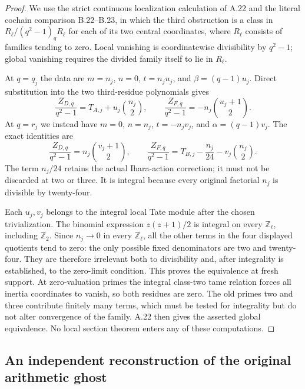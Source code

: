 \begin{proof}
We use the strict continuous localization calculation of A.22 and
the literal cochain comparison B.22--B.23, in
which the third obstruction is a class in
$R_\ell/(q^2-1)_qR_\ell$ for each of its two central coordinates,
where $R_\ell$ consists of families tending to zero. Local vanishing
is coordinatewise divisibility by $q^2-1$; global vanishing requires
the divided family itself to lie in $R_\ell$.

At $q=q_j$ the data are
$m=n_j$, $n=0$, $t=n_ju_j$, and $\beta=(q-1)u_j$.
Direct substitution into the two third-residue polynomials gives
\[
\frac{Z_{D,q}}{q^2-1}
 =T_{A,j}+u_j\binom{n_j}{2},\qquad
\frac{Z_{F,q}}{q^2-1}
 =-n_j\binom{u_j+1}{2}.
\]
At $q=r_j$ we instead have $m=0$, $n=n_j$, $t=-n_jv_j$,
and $\alpha=(q-1)v_j$. The exact identities are
\[
\frac{Z_{D,q}}{q^2-1}
 =n_j\binom{v_j+1}{2},\qquad
\frac{Z_{F,q}}{q^2-1}
 =T_{B,j}-\frac{n_j}{24}-v_j\binom{n_j}{2}.
\]
The term $n_j/24$ retains the actual Ihara-action correction; it
must not be discarded at two or three. It is integral because every
original factorial $n_j$ is divisible by twenty-four.

Each $u_j,v_j$ belongs to the integral local Tate module after the
chosen trivialization. The binomial expression $z(z+1)/2$ is integral
on every $\mathbb Z_\ell$, including $\mathbb Z_2$. Since
$n_j\to0$ in every $\mathbb Z_\ell$, all the other terms in the
four displayed quotients tend to zero: the only possible fixed
denominators are two and twenty-four. They are therefore irrelevant
both to divisibility and, after integrality is established, to the
zero-limit condition. This proves the equivalence at fresh support.
At zero-valuation primes the integral class-two tame relation forces
all inertia coordinates to vanish, so both residues are zero. The
old primes two and three contribute finitely many terms, which must
be tested for integrality but do not alter convergence of the family.
A.22 then gives the asserted global equivalence. No local section
theorem enters any of these computations.
\end{proof}

\subsection{An independent reconstruction of the original arithmetic ghost}

